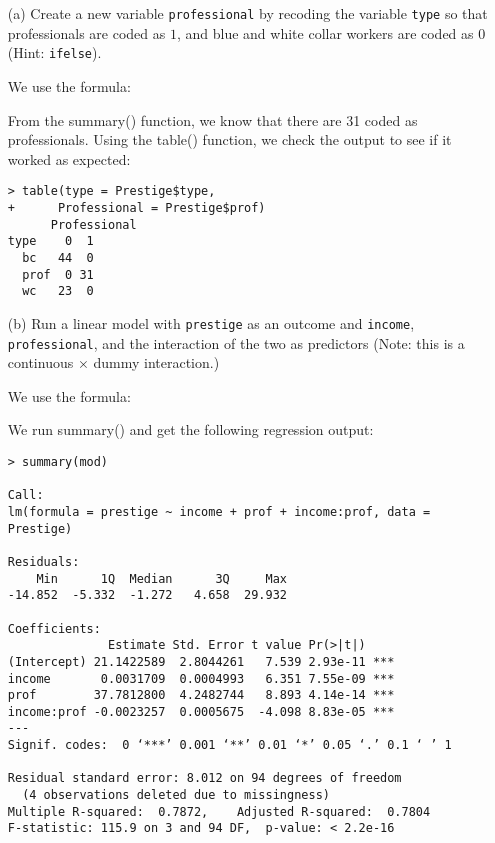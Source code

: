 \documentclass[12pt,letterpaper]{article}
\begin{document}
\newpage
\begin{enumerate}
	
	\item [(a)]
	Create a new variable \texttt{professional} by recoding the variable \texttt{type} so that professionals are coded as $1$, and blue and white collar workers are coded as $0$ (Hint: \texttt{ifelse}).
	
	\vspace{0.6cm}
\noindent We use the formula:
\vspace{.5cm}
  
\vspace{.5cm}   
\noindent From the summary() function, we know that there are 31 coded as professionals. Using the table() function, we check the output to see if it worked as expected:
\begin{verbatim}
> table(type = Prestige$type,
+      Professional = Prestige$prof)
      Professional
type    0  1
  bc   44  0
  prof  0 31
  wc   23  0
\end{verbatim}
	
	\item [(b)]
	Run a linear model with \texttt{prestige} as an outcome and \texttt{income}, \texttt{professional}, and the interaction of the two as predictors (Note: this is a continuous $\times$ dummy interaction.)
	
	\vspace{0.6cm}
\noindent We use the formula:
\vspace{.5cm}
  
\vspace{.5cm}   
\noindent We run summary() and get the following regression output:
\begin{verbatim}
> summary(mod)

Call:
lm(formula = prestige ~ income + prof + income:prof, data = Prestige)

Residuals:
    Min      1Q  Median      3Q     Max 
-14.852  -5.332  -1.272   4.658  29.932 

Coefficients:
              Estimate Std. Error t value Pr(>|t|)    
(Intercept) 21.1422589  2.8044261   7.539 2.93e-11 ***
income       0.0031709  0.0004993   6.351 7.55e-09 ***
prof        37.7812800  4.2482744   8.893 4.14e-14 ***
income:prof -0.0023257  0.0005675  -4.098 8.83e-05 ***
---
Signif. codes:  0 ‘***’ 0.001 ‘**’ 0.01 ‘*’ 0.05 ‘.’ 0.1 ‘ ’ 1

Residual standard error: 8.012 on 94 degrees of freedom
  (4 observations deleted due to missingness)
Multiple R-squared:  0.7872,	Adjusted R-squared:  0.7804 
F-statistic: 115.9 on 3 and 94 DF,  p-value: < 2.2e-16
\end{verbatim}


\end{enumerate}
\end{document}
